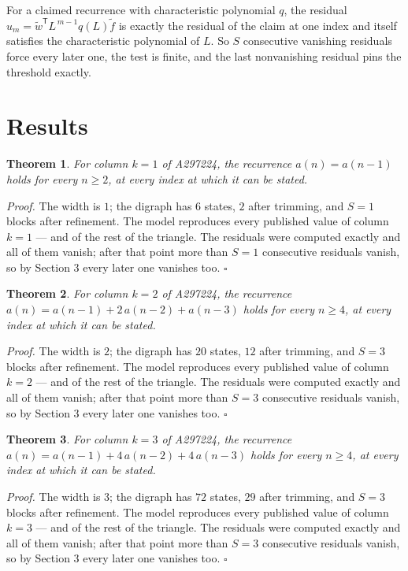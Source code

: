 \documentclass[11pt]{article}
\newtheorem{theorem}{Theorem}
\theoremstyle{definition}
\begin{document}
For a claimed recurrence with characteristic polynomial $q$, the residual $u_m = \tilde w^{\mathsf T}L^{\,m-1}q(L)\tilde f$ is exactly the residual of the claim at one index and itself satisfies the characteristic polynomial of $L$. So $S$ consecutive vanishing residuals force every later one, the test is finite, and the last nonvanishing residual pins the threshold exactly.

\section{Results}

\begin{theorem} For column $k = 1$ of A297224, the recurrence $a(n) = a(n-1)$ holds for every $n \ge 2$, at every index at which it can be stated.\end{theorem}

{\itshape Proof.} The width is $1$; the digraph has $6$ states, $2$ after trimming, and $S = 1$ blocks after refinement. The model reproduces every published value of column $k = 1$ --- and of the rest of the triangle. The residuals were computed exactly and all of them vanish; after that point more than $S = 1$ consecutive residuals vanish, so by Section 3 every later one vanishes too. $\square$

\begin{theorem} For column $k = 2$ of A297224, the recurrence $a(n) = a(n-1) + 2\,a(n-2) + a(n-3)$ holds for every $n \ge 4$, at every index at which it can be stated.\end{theorem}

{\itshape Proof.} The width is $2$; the digraph has $20$ states, $12$ after trimming, and $S = 3$ blocks after refinement. The model reproduces every published value of column $k = 2$ --- and of the rest of the triangle. The residuals were computed exactly and all of them vanish; after that point more than $S = 3$ consecutive residuals vanish, so by Section 3 every later one vanishes too. $\square$

\begin{theorem} For column $k = 3$ of A297224, the recurrence $a(n) = a(n-1) + 4\,a(n-2) + 4\,a(n-3)$ holds for every $n \ge 4$, at every index at which it can be stated.\end{theorem}

{\itshape Proof.} The width is $3$; the digraph has $72$ states, $29$ after trimming, and $S = 3$ blocks after refinement. The model reproduces every published value of column $k = 3$ --- and of the rest of the triangle. The residuals were computed exactly and all of them vanish; after that point more than $S = 3$ consecutive residuals vanish, so by Section 3 every later one vanishes too. $\square$
\end{document}
